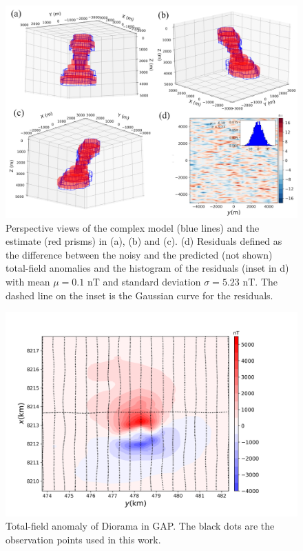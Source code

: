 \begin{figure}
    \centering
    \includegraphics[scale=.75]{figures/complex_estimates_residual.png}
    \caption{Perspective views of the complex model (blue lines) and the estimate (red prisms) in (a), (b) and (c). (d) Residuals defined as the difference between the noisy and the predicted (not shown) total-field anomalies and the histogram of the residuals (inset in d) with mean $\mu=0.1$ nT and standard deviation $\sigma=5.23$ nT. The dashed line on the inset is the Gaussian curve for the residuals.
}
    \label{fig:complex_result}
\end{figure}

\begin{figure}
    \centering
    \includegraphics[scale=.5]{figures/diorama_real_data.png}
    \caption{Total-field anomaly of Diorama in GAP. The black dots are the observation points used in this work.
}
    \label{fig:real_data}
\end{figure}

